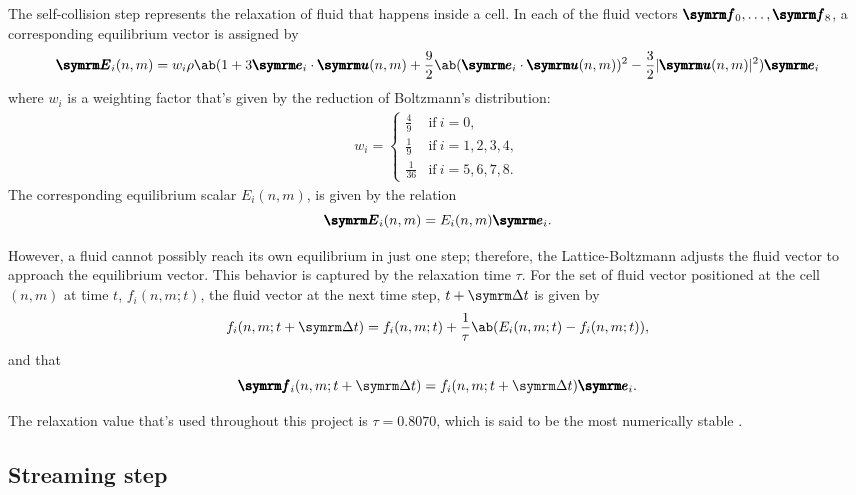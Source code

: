 The self-collision step represents the relaxation of fluid that happens inside a cell. In each of the fluid vectors $\vv{f}_0,\dots,\vv{f}_8$, a corresponding equilibrium vector is assigned by
\begin{equation}
	\vv{E}_i(n, m) = w_i\rho\ab(1 + 3\vv{e}_i \cdot \vv{u}(n, m) + \frac{9}{2}\ab(\vv{e}_i \cdot \vv{u}(n, m))^2 - \frac{3}{2}|\vv{u}(n, m)|^2)\vv{e}_i \label{eq:self-collision-calculation-1}
\end{equation}
where $w_i$ is a weighting factor that's given by the reduction of Boltzmann's distribution:
\begin{gather}
	w_i = \begin{cases}
		\frac{4}{9}  & \textrm{if} ~ i = 0,          \\
		\frac{1}{9}  & \textrm{if} ~ i = 1, 2, 3, 4, \\
		\frac{1}{36} & \textrm{if} ~ i = 5, 6, 7, 8.
	\end{cases} \label{eq:lbm-weights}
\end{gather}
The corresponding equilibrium scalar $E_i(n, m)$, is given by the relation
\begin{equation}
	\vv{E}_i(n, m) = E_i(n, m)\vv{e}_i.
\end{equation}

However, a fluid cannot possibly reach its own equilibrium in just one step; therefore, the Lattice-Boltzmann adjusts the fluid vector to approach the equilibrium vector. This behavior is captured by the relaxation time $\tau$. For the set of fluid vector positioned at the cell $(n, m)$ at time $t$, $f_i(n, m; t)$, the fluid vector at the next time step, $t + \Dd{t}$ is given by
\begin{equation}
	f_i(n, m; t + \Dd{t}) = f_i(n, m; t) + \frac{1}{\tau}\ab(E_i(n, m; t) - f_i(n, m; t)), \label{eq:self-collision-calculation-2}
\end{equation}
and that
\begin{equation}
	\vv{f}_i(n, m; t + \Dd{t}) = f_i(n, m; t + \Dd{t})\vv{e}_i.
\end{equation}

The relaxation value that's used throughout this project is $\tau = 0.8070$, which is said to be the most numerically stable \cite{zhao-2013}.

\subsection{Streaming step}

